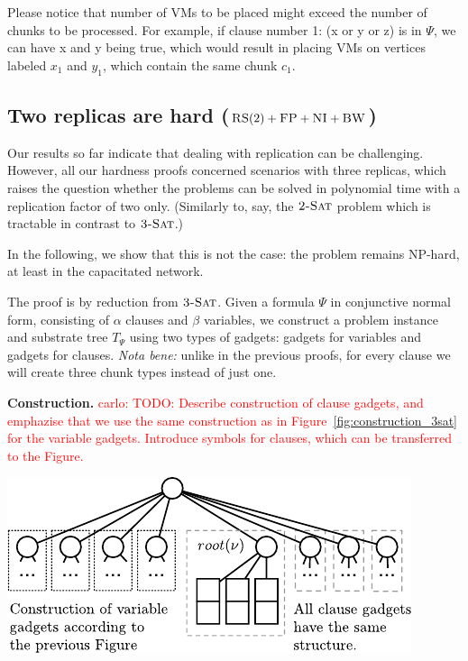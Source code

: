 \documentclass[9pt]{sigcomm-alternate}
\newcommand{\carlo}[1]{\textcolor{red}{carlo: #1}}
\newcommand{\clauses}{\alpha}
\newcommand{\vars}{\beta}
\newcommand{\CC}{\textsc{NI}}
\newcommand{\FP}{\textsc{FP}}
\newcommand{\RS}{\textsc{RS}}
\newcommand{\BW}{\textsc{BW}}
\newcommand{\TSAT}{\textsc{3-Sat}}
\newcommand{\ZSAT}{\textsc{2-Sat}}
\newcommand{\Formula}{\ensuremath{\Psi}}
\begin{document}
\begin{appendix}
Please notice that number of VMs to be placed might exceed the number
of chunks to be processed. For example, if clause number 1: (x or y or z) is in
$\Formula$, we can have x and y being true, which would result in
placing VMs on vertices labeled $x_1$ and $y_1$, which contain the
same chunk $c_1$.



\subsection{Two replicas are hard
  ($\RS(2)+\FP+\CC+\BW$)}\label{ssec:two}
Our results so far indicate that dealing with replication can be challenging.
However, all our hardness proofs concerned scenarios with three replicas,
which raises the question whether the problems can be solved in polynomial time
with a replication factor of two only. (Similarly to, say, the $\ZSAT$ problem
which is tractable in contrast to $\TSAT$.)

In the following, we show that this is not the case: the problem remains
NP-hard, at least in the capacitated network.

The proof is by reduction from $\TSAT$. Given a formula $\Formula$ in
conjunctive normal form, consisting of $\clauses$ clauses and $\vars$ variables, we construct a problem instance and substrate tree
$T_{\Formula}$ using two types of gadgets: gadgets for variables and
gadgets for clauses. \emph{Nota bene:}
unlike in the previous proofs, for every clause we will create three chunk types instead of just one.

\textbf{Construction.}
\carlo{TODO: Describe construction of clause gadgets, and emphazise that we use
the same construction as in Figure~\ref{fig:construction_3sat} for the variable
gadgets. Introduce symbols for clauses, which can be transferred to the Figure.}

\includegraphics{figs/construction_2replica}

\begin{enumerate}


\end{enumerate}
\end{appendix}
\end{document}
